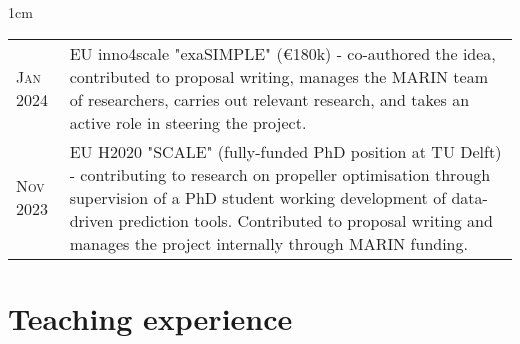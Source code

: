 \documentclass[a4paper,10pt]{article}
\begin{document}
\begin{minipage}{\textwidth}
\begin{adjustwidth}{}{1cm}

{\renewcommand{\arraystretch}{1.2}
\begin{tabular}{l p{14.5cm}}
\textsc{Jan 2024} & EU inno4scale "exaSIMPLE" (€180k) - co-authored the idea, contributed to proposal writing, manages the MARIN team of researchers, carries out relevant research, and takes an active role in steering the project. \\
%
\textsc{Nov 2023} & EU H2020 "SCALE" (fully-funded PhD position at TU Delft) - contributing to research on propeller optimisation through supervision of a PhD student working development of data-driven prediction tools. Contributed to proposal writing and manages the project internally through MARIN funding. \\
\end{tabular}
}

\end{adjustwidth}
\end{minipage}


\section{Teaching experience}
\end{document}
